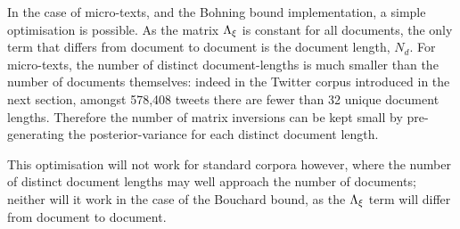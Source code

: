 In the case of micro-texts, and the Bohning bound implementation, a simple optimisation is possible. As the matrix ${ \Lambda_{\xi} }$ is constant for all documents, the only term that differs from document to document is the document length, $N_d$. For micro-texts, the number of distinct document-lengths is much smaller than the number of documents themselves: indeed in the Twitter corpus introduced in the next section, amongst 578,408 tweets there are fewer than 32 unique document lengths. Therefore the number of matrix inversions can be kept small by pre-generating the posterior-variance for each distinct document length.

This optimisation will not work for standard corpora however, where the number of distinct document lengths may well approach the number of documents; neither will it work in the case of the Bouchard bound, as the ${ \Lambda_{\xi} }$ term will differ from document to document. %


